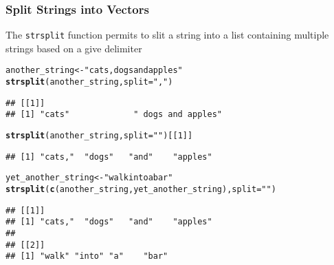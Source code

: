 \documentclass[paper=screen,mathserif]{beamer}\usepackage[]{graphicx}\usepackage[]{color}
\makeatletter
\newcommand{\hlnum}[1]{\textcolor[rgb]{0.686,0.059,0.569}{#1}}%
\newcommand{\hlstr}[1]{\textcolor[rgb]{0.192,0.494,0.8}{#1}}%
\newcommand{\hlstd}[1]{\textcolor[rgb]{0.345,0.345,0.345}{#1}}%
\newcommand{\hlkwb}[1]{\textcolor[rgb]{0.69,0.353,0.396}{#1}}%
\newcommand{\hlkwc}[1]{\textcolor[rgb]{0.333,0.667,0.333}{#1}}%
\newcommand{\hlkwd}[1]{\textcolor[rgb]{0.737,0.353,0.396}{\textbf{#1}}}%
\newenvironment{kframe}{%
 \def\at@end@of@kframe{}%
 \ifinner\ifhmode%
  \def\at@end@of@kframe{\end{minipage}}%
  \begin{minipage}{\columnwidth}%
 \fi\fi%
 \def\FrameCommand##1{\hskip\@totalleftmargin \hskip-\fboxsep
 \colorbox{shadecolor}{##1}\hskip-\fboxsep
     \hskip-\linewidth \hskip-\@totalleftmargin \hskip\columnwidth}%
 \MakeFramed {\advance\hsize-\width
   \@totalleftmargin\z@ \linewidth\hsize
   \@setminipage}}%
 {\par\unskip\endMakeFramed%
 \at@end@of@kframe}
\newenvironment{knitrout}{}{} %
\newcommand{\ft}[1]{\frametitle{#1}}
\newenvironment{xframe}[1][]
{\begin{frame}[fragile,environment=xframe]
    \frametitle{#1}}
  {\end{frame}}
\makeatother
\begin{document}
\begin{xframe}
  \ft{Split Strings into Vectors}
  
  The {\tt strsplit} function permits to slit a string into a list
  containing multiple strings based on a give delimiter
\begin{knitrout}\scriptsize
{}\color{fgcolor}\begin{kframe}
\begin{alltt}
\hlstd{another_string} \hlkwb{<-} \hlstr{"cats, dogs and apples"}
\hlkwd{strsplit}\hlstd{(another_string,} \hlkwc{split} \hlstd{=} \hlstr{","}\hlstd{)}
\end{alltt}
\begin{verbatim}
## [[1]]
## [1] "cats"             " dogs and apples"
\end{verbatim}
\begin{alltt}
\hlkwd{strsplit}\hlstd{(another_string,} \hlkwc{split} \hlstd{=} \hlstr{" "}\hlstd{)[[}\hlnum{1}\hlstd{]]}
\end{alltt}
\begin{verbatim}
## [1] "cats,"  "dogs"   "and"    "apples"
\end{verbatim}
\end{kframe}
\end{knitrout}
\begin{knitrout}\scriptsize
{}\color{fgcolor}\begin{kframe}
\begin{alltt}
\hlstd{yet_another_string} \hlkwb{<-} \hlstr{"walk into a bar"}
\hlkwd{strsplit}\hlstd{(}\hlkwd{c}\hlstd{(another_string, yet_another_string),} \hlkwc{split} \hlstd{=} \hlstr{" "}\hlstd{)}
\end{alltt}
\begin{verbatim}
## [[1]]
## [1] "cats,"  "dogs"   "and"    "apples"
## 
## [[2]]
## [1] "walk" "into" "a"    "bar"
\end{verbatim}
\end{kframe}
\end{knitrout}

\end{xframe}
\end{document}
